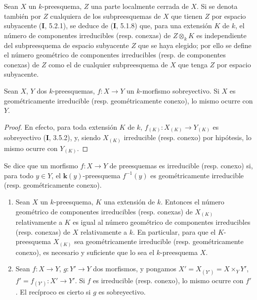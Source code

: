 \begin{env}[4.5.3]
\label{IV.2.4.5.3-fr}
Sean $X$ un $k$-preesquema, $Z$ una parte localmente cerrada de $X$. Si se
denota también por $Z$ cualquiera de los subpreesquemas de $X$ que tienen $Z$
por espacio subyacente (\textbf I, 5.2.1), se deduce de (\textbf I, 5.1.8) que, para una
extensión $K$ de $k$, el número de componentes irreducibles (resp. conexas) de
$Z\otimes_k K$ es independiente del subpreesquema de espacio subyacente $Z$
que se haya elegido; por ello se define el número geométrico de componentes
irreducibles (resp. de componentes conexas) de $Z$ como el de cualquier
subpreesquema de $X$ que tenga $Z$ por espacio subyacente.
\end{env}

\begin{proposition}[4.5.4]
\label{IV.2.4.5.4-fr}
Sean $X$, $Y$ dos $k$-preesquemas, $f:X\to Y$ un $k$-morfismo sobreyectivo.
Si $X$ es geométricamente irreducible \textup{(resp.} geométricamente conexo\textup{)}, lo mismo
ocurre con $Y$.
\end{proposition}


\begin{proof}
En efecto, para toda extensión $K$ de $k$, $f_{(K)}:X_{(K)}\to Y_{(K)}$ es
sobreyectivo (\textbf I, 3.5.2), y, siendo $X_{(K)}$ irreducible (resp. conexo) por
hipótesis, lo mismo ocurre con $Y_{(K)}$.
\end{proof}

\begin{definition}[4.5.5]
\label{IV.2.4.5.5-fr}
Se dice que un morfismo $f:X\to Y$ de preesquemas es irreducible
\textup{(resp.} conexo\textup{)} si, para todo $y\in Y$, el $\boldsymbol{k}(y)$-preesquema
$f^{-1}(y)$ es geométricamente irreducible \textup{(resp.} geométricamente conexo\textup{)}.
\end{definition}

\begin{proposition}[4.5.6]
\label{IV.2.4.5.6-fr}
\begin{enumerate}
\item[\textup{(i)}] Sean $X$ un $k$-preesquema, $K$ una extensión de $k$. Entonces el
número geométrico de componentes irreducibles \textup{(resp.} conexas\textup{)} de $X_{(K)}$
relativamente a $K$ es igual al número geométrico de componentes irreducibles
\textup{(resp.} conexas\textup{)} de $X$ relativamente a $k$. En particular, para que el
$K$-preesquema $X_{(K)}$ sea geométricamente irreducible \textup{(resp.}
geométricamente conexo\textup{)}, es necesario y suficiente que lo sea el
$k$-preesquema $X$.
\item[\textup{(ii)}] Sean $f:X\to Y$, $g:Y'\to Y$ dos morfismos, y pongamos
$X'=X_{(Y')}=X\times_Y Y'$, $f'=f_{(Y')}:X'\to Y'$. Si $f$ es irreducible
\textup{(resp.} conexo\textup{)}, lo mismo ocurre con $f'$. El recíproco es cierto si $g$ es
sobreyectivo.
\end{enumerate}
\end{proposition}

